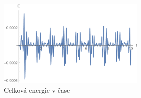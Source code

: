 \documentclass[reqno, a4paper]{amsart}
\begin{document}
\begin{figure}[h]
\begin{flushleft}
\includegraphics[width=0.65\textwidth]{Runge - Kutta, Energie}
\caption{Celková energie v čase}
\end{flushleft}
\end{figure}


\end{document}
